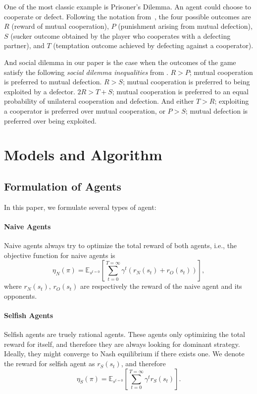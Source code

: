 \documentclass{article}
\begin{document}
One of the most classic example is Prisoner's Dilemma.
An agent could choose to cooperate or defect.
Following the notation from~\cite{macy2002learning, leibo2017multi},
the four possible outcomes are $R$ (reward of mutual cooperation),
$P$ (punishment arising from mutual defection),
$S$ (sucker outcome obtained by the player who cooperates with a defecting partner),
and $T$ (temptation outcome achieved by defecting against a cooperator).

And social dilemma in our paper is the case when the outcomes of the game
satisfy the following \emph{social dilemma inequalities} from \cite{macy2002learning}.
$R > P$; mutual cooperation is preferred to mutual defection.
$R > S$; mutual cooperation is preferred to being exploited by a defector.
$2R > T + S$;
mutual cooperation is preferred to an equal probability of unilateral cooperation and defection.
And either $T > R$; exploiting a cooperator is preferred over mutual cooperation,
or $P > S$; mutual defection is preferred over being exploited.

\section{Models and Algorithm}


\subsection{Formulation of Agents}
In this paper, we formulate several types of agent:
\paragraph{Naive Agents}
Naive agents always try to optimize the total reward of both agents, i.e., the objective function for naive agents is
\begin{equation}\label{equation:naive_objective}
    \eta_N(\pi) =
    \mathbb{E}_{s^{t=0}}\left[\sum_{t=0}^{T=\infty}\gamma^t \left(r_N(s_t) + r_O(s_t)\right)\right],
\end{equation}
where \(r_N(s_t),\, r_O(s_t)\) are respectively the reward of the naive agent and its opponents.
\paragraph{Selfish Agents}
Selfish agents are truely rational agents.
These agents only optimizing the total reward for itself,
and therefore they are always looking for dominant strategy.
Ideally, they might converge to Nash equilibrium if there exists one.
We denote the reward for selfish agent as \(r_S(s_t)\), and therefore
\begin{equation}\label{equation:self_objective}
    \eta_S(\pi) =
    \mathbb{E}_{s^{t=0}}\left[\sum_{t=0}^{T=\infty}\gamma^t r_S(s_t)\right].
\end{equation}
\end{document}

